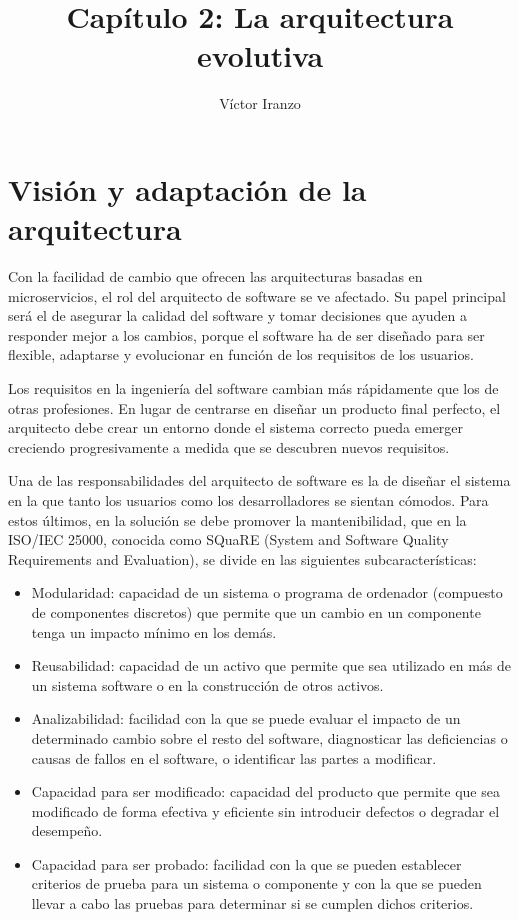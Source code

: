 \documentclass[11pt,a4paper]{article}
\author{Víctor Iranzo}
\title{Capítulo 2: La arquitectura evolutiva}
\begin{document}
\maketitle

\section{Visión y adaptación de la arquitectura}
Con la facilidad de cambio que ofrecen las arquitecturas basadas en microservicios, el rol del arquitecto de software se ve afectado. Su papel principal será el de asegurar la calidad del software y tomar decisiones que ayuden a responder mejor a los cambios, porque el software ha de ser diseñado para ser flexible, adaptarse y evolucionar en función de los requisitos de los usuarios.

Los requisitos en la ingeniería del software cambian más rápidamente que los de otras profesiones. En lugar de centrarse en diseñar un producto final perfecto, el arquitecto debe crear un entorno donde el sistema correcto pueda emerger creciendo progresivamente a medida que se descubren nuevos requisitos.

Una de las responsabilidades del arquitecto de software es la de diseñar el sistema en la que tanto los usuarios como los desarrolladores se sientan cómodos. Para estos últimos, en la solución se debe promover la mantenibilidad, que en la ISO/IEC 25000, conocida como SQuaRE (System and Software Quality Requirements and Evaluation), se divide en las siguientes subcaracterísticas:

\begin{itemize}

\item Modularidad: capacidad de un sistema o programa de ordenador (compuesto de componentes discretos) que permite que un cambio en un componente tenga un impacto mínimo en los demás.

\item Reusabilidad: capacidad de un activo que permite que sea utilizado en más de un sistema software o en la construcción de otros activos.

\item Analizabilidad: facilidad con la que se puede evaluar el impacto de un determinado cambio sobre el resto del software, diagnosticar las deficiencias o causas de fallos en el software, o identificar las partes a modificar.

\item Capacidad para ser modificado: capacidad del producto que permite que sea modificado de forma efectiva y eficiente sin introducir defectos o degradar el desempeño.

\item Capacidad para ser probado: facilidad con la que se pueden establecer criterios de prueba para un sistema o componente y con la que se pueden llevar a cabo las pruebas para determinar si se cumplen dichos criterios.

\end{itemize}
\end{document}

